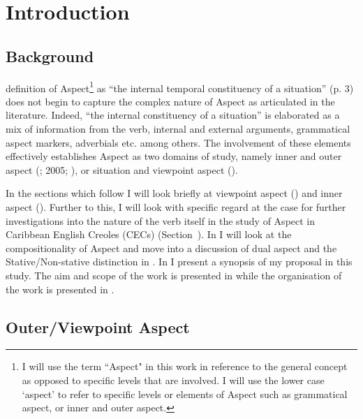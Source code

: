 
\chapter{Introduction}\label{ch:1}
\section{Background}\label{sec:1}

 definition of Aspect\footnote{I will use the term ``Aspect"
in this work in reference to the general concept as opposed to specific levels
that are involved.  I will use the lower case `aspect' to refer to specific
levels or elements of Aspect such as grammatical aspect, or inner and outer
aspect.} as ``the internal temporal constituency of a situation'' (p. 3) does not
begin to capture the complex nature of Aspect as articulated in the literature.
Indeed,  ``the internal constituency of a situation'' is elaborated as a
mix of information from the verb, internal and external arguments, grammatical
aspect markers, adverbials etc.
\citep[cf.][]{Klein1994,Krifka1998,Jackendoff1996,MacDonald2008,Mourelatos1981,Ramchand2008,Rothstein2004,Tenny1994,TennyPustejovsky2000,Verkuyl1993,Verkuyl1993,Verkuyl1999}
among others.  The involvement of these elements effectively establishes Aspect
as two domains of study, namely inner and outer aspect (\citealt{Travis1991};
2005; \citealt{Verkuyl1993}), or situation and viewpoint aspect
(\citealt{Smith1983,Smith1991}).

In the sections which follow I will look briefly at viewpoint aspect
() and inner aspect ().  Further to this, I
will look with specific regard at the case for further investigations into the
nature of the verb itself in the study of Aspect in Caribbean English Creoles
(CECs) (Section~).  In  I will look at the
compositionality of Aspect and move into a discussion of dual aspect and the
Stative\slash Non-stative distinction in .  In  I
present a synopsis of my proposal in this study.  The aim and scope of the work
is presented in  while the organisation of the work is
presented in .

\section{Outer/Viewpoint Aspect}\label{sec:1.1}

